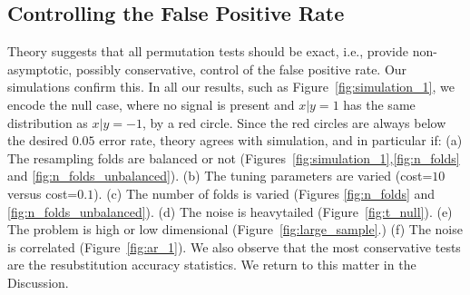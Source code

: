 \documentclass[12pt,a4paper]{article}
\begin{document}
\subsection{Controlling the False Positive Rate}
\label{sec:type_i}

Theory suggests that all permutation tests should be exact, i.e., provide non-asymptotic, possibly conservative, control of the false positive rate. 
Our simulations confirm this.
In all our results, such as Figure~\ref{fig:simulation_1}, we encode the null case, where no signal is present and $x|y=1$ has the same distribution as $x|y=-1$, by a red circle. 
Since the red circles are always below the desired $0.05$ error rate, theory agrees with simulation, and in particular if: \newline
(a) The resampling folds are balanced or not (Figures~\ref{fig:simulation_1},\ref{fig:n_folds} and \ref{fig:n_folds_unbalanced}). \newline
(b) The tuning parameters are varied (cost=$10$ versus cost=$0.1$). \newline
(c) The number of folds is varied (Figures \ref{fig:n_folds} and \ref{fig:n_folds_unbalanced}). \newline
(d) The noise is heavytailed (Figure~\ref{fig:t_null}). \newline
(e) The problem is high or low dimensional (Figure~\ref{fig:large_sample}.) \newline
(f) The noise is correlated (Figure~\ref{fig:ar_1}). \newline
We also observe that the most conservative tests are the resubstitution accuracy statistics. 
We return to this matter in the Discussion.
\end{document}
